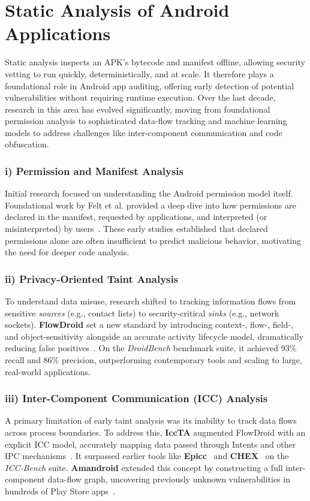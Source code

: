 \documentclass[a4paper,12pt]{report}
\begin{document}
\section{Static Analysis of Android Applications}
\label{sec:rw:static}

Static analysis inspects an APK's bytecode and manifest offline, allowing security vetting to run quickly, deterministically, and at scale. It therefore plays a foundational role in Android app auditing, offering early detection of potential vulnerabilities without requiring runtime execution. Over the last decade, research in this area has evolved significantly, moving from foundational permission analysis to sophisticated data-flow tracking and machine learning models to address challenges like inter-component communication and code obfuscation.

\subsubsection{i) Permission and Manifest Analysis}
Initial research focused on understanding the Android permission model itself. Foundational work by Felt et al. provided a deep dive into how permissions are declared in the manifest, requested by applications, and interpreted (or misinterpreted) by users~\cite{felt2011androidprivacy}. These early studies established that declared permissions alone are often insufficient to predict malicious behavior, motivating the need for deeper code analysis.

\subsubsection{ii) Privacy-Oriented Taint Analysis}
To understand data misuse, research shifted to tracking information flows from sensitive \emph{sources} (e.g., contact lists) to security-critical \emph{sinks} (e.g., network sockets). \textbf{FlowDroid} set a new standard by introducing context-, flow-, field-, and object-sensitivity alongside an accurate activity lifecycle model, dramatically reducing false positives~\cite{arzt2014flowdroid}. On the \emph{DroidBench} benchmark suite, it achieved 93\% recall and 86\% precision, outperforming contemporary tools and scaling to large, real-world applications.

\subsubsection{iii) Inter-Component Communication (ICC) Analysis}
A primary limitation of early taint analysis was its inability to track data flows across process boundaries. To address this, \textbf{IccTA} augmented FlowDroid with an explicit ICC model, accurately mapping data passed through Intents and other IPC mechanisms~\cite{li2015iccta}. It surpassed earlier tools like \textbf{Epicc}~\cite{octeau2013epicc} and \textbf{CHEX}~\cite{lu2012chex} on the \emph{ICC-Bench} suite. \textbf{Amandroid} extended this concept by constructing a full inter-component data-flow graph, uncovering previously unknown vulnerabilities in hundreds of Play Store apps~\cite{wei2014amandroid}.
\end{document}
